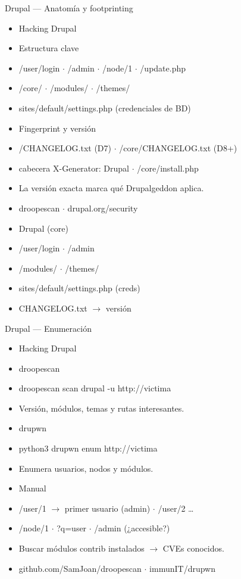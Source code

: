 \documentclass[aspectratio=169,10pt]{beamer}
\begin{document}
\begin{frame}[allowframebreaks]{Drupal --- Anatomía y footprinting}
\small
  \begin{itemize}
  \item Hacking Drupal
  \item Estructura clave
  \item /user/login $\cdot$ /admin $\cdot$ /node/1 $\cdot$ /update.php
  \item /core/ $\cdot$ /modules/ $\cdot$ /themes/
  \item sites/default/settings.php (credenciales de BD)
  \item Fingerprint y versión
  \item /CHANGELOG.txt (D7) $\cdot$ /core/CHANGELOG.txt (D8+)
  \item cabecera X-Generator: Drupal $\cdot$ /core/install.php
  \item La versión exacta marca qué Drupalgeddon aplica.
  \item droopescan $\cdot$ drupal.org/security
  \item Drupal (core)
  \item /user/login $\cdot$ /admin
  \item /modules/ $\cdot$ /themes/
  \item sites/default/settings.php (creds)
  \item CHANGELOG.txt $\rightarrow$ versión
  \end{itemize}
\end{frame}

\begin{frame}[allowframebreaks]{Drupal --- Enumeración}
\small
  \begin{itemize}
  \item Hacking Drupal
  \item droopescan
  \item droopescan scan drupal -u http://victima
  \item Versión, módulos, temas y rutas interesantes.
  \item drupwn
  \item python3 drupwn enum http://victima
  \item Enumera usuarios, nodos y módulos.
  \item Manual
  \item /user/1 $\rightarrow$ primer usuario (admin) $\cdot$ /user/2 \dots{}
  \item /node/1 $\cdot$ ?q=user $\cdot$ /admin (¿accesible?)
  \item Buscar módulos contrib instalados $\rightarrow$ CVEs conocidos.
  \item github.com/SamJoan/droopescan $\cdot$ immunIT/drupwn
  \end{itemize}
\end{frame}
\end{document}
